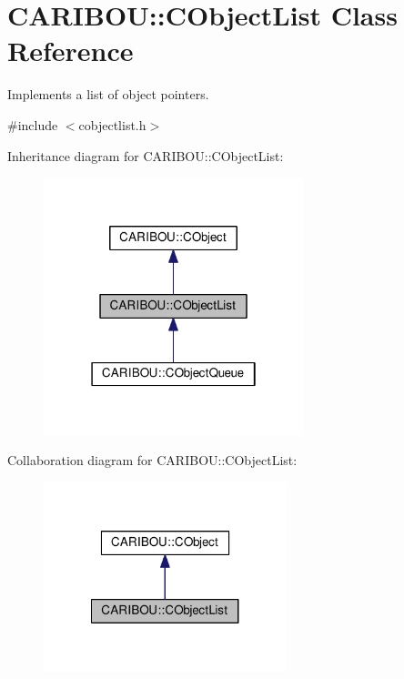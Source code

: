 \section{C\-A\-R\-I\-B\-O\-U\-:\-:C\-Object\-List Class Reference}
\label{class_c_a_r_i_b_o_u_1_1_c_object_list}


Implements a list of object pointers.  




{\ttfamily \#include $<$cobjectlist.\-h$>$}



Inheritance diagram for C\-A\-R\-I\-B\-O\-U\-:\-:C\-Object\-List\-:\nopagebreak
\begin{figure}[H]
\begin{center}
\leavevmode
\includegraphics[width=214pt]{class_c_a_r_i_b_o_u_1_1_c_object_list__inherit__graph}
\end{center}
\end{figure}


Collaboration diagram for C\-A\-R\-I\-B\-O\-U\-:\-:C\-Object\-List\-:\nopagebreak
\begin{figure}[H]
\begin{center}
\leavevmode
\includegraphics[width=200pt]{class_c_a_r_i_b_o_u_1_1_c_object_list__coll__graph}
\end{center}
\end{figure}
